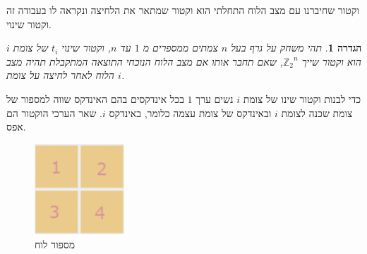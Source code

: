 \documentclass[12pt,leqno]{article}
\newtheorem{definition}{הגדרה}[section]
\newcommand{\Zn}{{\mathbb{Z}_2}^n}
\begin{document}
וקטור שחיברנו עם מצב הלוח התחלתי הוא וקטור שמתאר את הלחיצה ונקראה לו בעבודה זה וקטור שינוי.
 \begin{definition}
    תהי 
    משחק על גרף בעל
    $n$
    צמתים
    ממספרים מ
    $1$
    עד
    $n$,
    וקטור שינוי
    $t_i$
    של צומת  
    $i$
    הוא 
    וקטור 
    שייך 
    $\Zn$,
    שאם תחבר אותו אם מצב הלוח הנוכחי 
    התוצאה המתקבלת תהיה מצב הלוח 
    לאחר לחיצה על צומת 
    $i$.
\end{definition}
כדי לבנות וקטור שינו 
של 
צומת 
$i$
נשים ערך 
$1$
בכל אינדקסים 
בהם האינדקס שווה 
למספור 
של 
צומת 
שכנה
לצומת
$i$
ובאינדקס של צומת עצמה
כלומר,
באינדקס 
$i$.
שאר הערכי הוקטור הם אפס.

\begin{figure}[ht]
    \caption{מספור לוח}
    \label{fig:numbering_board_2x2}
    \centering
    \includegraphics[width=0.3\textwidth,keepaspectratio]{images/numbering_board_2x2.PNG}
\end{figure}
\end{document}
